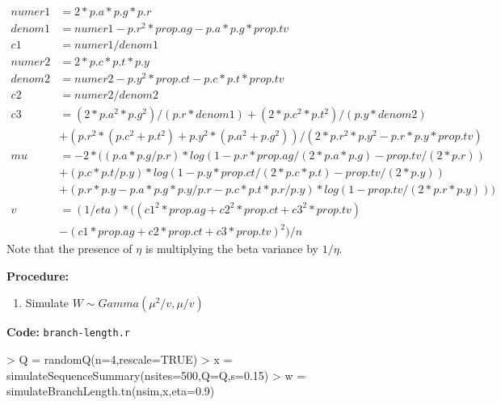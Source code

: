 \documentclass[12pt,letterpaper]{article}
\begin{document}
\begin{align*}
  numer1 &= 2*p.a*p.g*p.r \\
  denom1 &= numer1 - p.r^2*prop.ag - p.a*p.g*prop.tv \\
  c1 &= numer1 / denom1 \\
  numer2 &= 2*p.c*p.t*p.y \\
  denom2 &= numer2 - p.y^2*prop.ct - p.c*p.t*prop.tv \\
  c2 &= numer2 / denom2 \\
  c3 &= (2*p.a^2*p.g^2) / (p.r * denom1) + (2*p.c^2*p.t^2) / (p.y * denom2) \\
  &+ (p.r^2 * (p.c^2 + p.t^2) + p.y^2 * (p.a^2 + p.g^2) ) /(2*p.r^2*p.y^2 - p.r*p.y*prop.tv) \\
  mu &= -2 * ( (p.a*p.g/p.r) * log(1 - p.r*prop.ag/(2*p.a*p.g) - prop.tv/(2*p.r) )\\
  &+ (p.c*p.t/p.y) * log(1 - p.y*prop.ct/(2*p.c*p.t) - prop.tv/(2*p.y) ) \\
  &+
  (p.r*p.y - p.a*p.g*p.y/p.r - p.c*p.t*p.r/p.y) * log(1 -
  prop.tv/(2*p.r*p.y)) ) \\
  v &= (1/ eta) * ((c1^2*prop.ag + c2^2*prop.ct + c3^2*prop.tv) \\
&-(c1*prop.ag + c2*prop.ct + c3*prop.tv)^2)/n
\end{align*}
Note that the presence of $\eta$ is multiplying the beta variance by $1/ \eta$.

\textbf{Procedure:}
\begin{enumerate}
\item Simulate $W \sim Gamma(\mu^2/v,\mu/v)$
\end{enumerate}

\textbf{Code:} \texttt{branch-length.r}
\begin{Schunk}
\begin{Sinput}
> Q = randomQ(n=4,rescale=TRUE)
> x = simulateSequenceSummary(nsites=500,Q=Q,s=0.15)
> w = simulateBranchLength.tn(nsim,x,eta=0.9)
\end{Sinput}
\end{Schunk}
\end{document}
